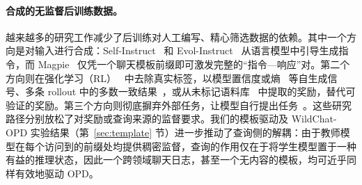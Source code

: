 \paragraph{合成的无监督后训练数据。}
越来越多的研究工作减少了后训练对人工编写、精心筛选数据的依赖。其中一个方向是对输入进行合成：Self-Instruct~\citep{wang2023self} 和 Evol-Instruct~\citep{xu2024wizardlm} 从语言模型中引导生成指令，而 Magpie~\citep{xu2025magpie} 仅凭一个聊天模板前缀即可激发完整的“指令—响应”对。第二个方向则在强化学习（RL）~\citep{he2026far} 中去除真实标签，以模型置信度或熵~\citep{zhao2026learning,agarwal2026unreasonable} 等自生成信号、多条 rollout 中的多数一致结果~\citep{zuo2026ttrl}，或从未标记语料库~\citep{dong2025reinforcement} 中提取的奖励，替代可验证的奖励。第三个方向则彻底摒弃外部任务，让模型自行提出任务~\citep{zhao2026absolute,zweiger2026self}。这些研究路径分别放松了对奖励或查询来源的监督要求。我们的模板驱动及 WildChat-OPD 实验结果（第~\ref{sec:template} 节）进一步推动了查询侧的解耦：由于教师模型在每个访问到的前缀处均提供稠密监督，查询的作用仅在于将学生模型置于一种有益的推理状态，因此一个跨领域聊天日志，甚至一个无内容的模板，均可近乎同样有效地驱动 OPD。